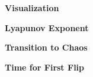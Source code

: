 \begin{problem}{1}
\textbf{Visualization}

\begin{figure}[ht!]
	\centering
	\caption{}
	\label{}
\end{figure}

\end{problem}

\begin{problem}{2}
\textbf{Lyapunov Exponent}

\begin{figure}[ht!]
	\centering
	\caption{}
	\label{}
\end{figure}

\end{problem}

\begin{problem}{3}
\textbf{Transition to Chaos}

\begin{figure}[ht!]
	\centering
	\caption{}
	\label{}
\end{figure}

\end{problem}

\begin{problem}{4}
\textbf{Time for First Flip}

\begin{figure}[ht!]
	\centering
	\caption{}
	\label{}
\end{figure}

\end{problem}